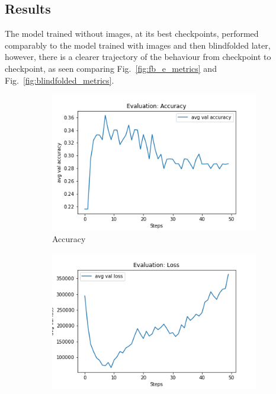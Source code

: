 \subsection{Results}
The model trained without images, at its best checkpoints, performed comparably to the model trained with images and then blindfolded later, however, there is a clearer trajectory of the behaviour from checkpoint to checkpoint, as seen comparing Fig.~\ref{fig:fb_e_metrics} and Fig.~\ref{fig:blindfolded_metrics}.

\begin{figure}[H]
     \centering
     \begin{subfigure}[b]{0.3\textwidth}
         \centering
         \includegraphics[width=\textwidth]{./figure/results/fully_blinded/eval/avg val accuracy.png}
         \caption{Accuracy}
         \label{fig:fb_e_accuracy}
     \end{subfigure}
     \hfill
     \begin{subfigure}[b]{0.3\textwidth}
         \centering
         \includegraphics[width=\textwidth]{./figure/results/fully_blinded/eval/avg val loss.png}

\end{subfigure}
\end{figure}
